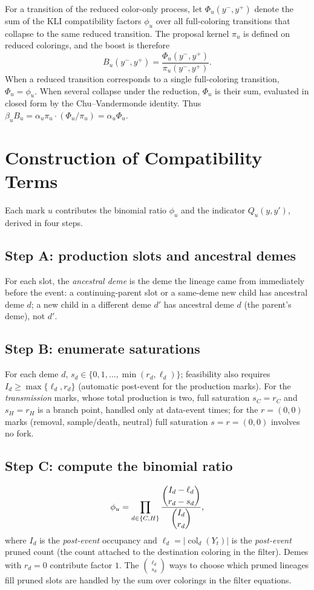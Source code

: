 \documentclass[11pt]{article}
\newcommand{\col}{\operatorname{col}}
\theoremstyle{plain}
\begin{document}
For a transition of the reduced color-only process, let $\Phi_u(y^-,y^+)$ denote the sum of
the KLI compatibility factors $\phi_u$ over all full-coloring transitions that collapse to the
same reduced transition. The proposal kernel $\pi_u$ is defined on reduced colorings, and the
boost is therefore
\[
B_u(y^-,y^+)=\frac{\Phi_u(y^-,y^+)}{\pi_u(y^-,y^+)}.
\]
When a reduced transition corresponds to a single full-coloring transition, $\Phi_u=\phi_u$.
When several collapse under the reduction, $\Phi_u$ is their sum, evaluated in closed form by the Chu--Vandermonde identity. Thus
$\beta_uB_u=\alpha_u\pi_u\cdot(\Phi_u/\pi_u)=\alpha_u\Phi_u$.

\section{Construction of Compatibility Terms}
Each mark $u$ contributes the binomial ratio $\phi_u$ and the indicator $Q_u(y,y')$, derived in
four steps.

\subsection{Step A: production slots and ancestral demes}
For each slot, the \emph{ancestral deme} is the deme the lineage came from immediately before the
event: a continuing-parent slot or a same-deme new child has ancestral deme $d$; a new child in a
different deme $d'$ has ancestral deme $d$ (the parent's deme), not $d'$.

\subsection{Step B: enumerate saturations}
For each deme $d$, $s_d\in\{0,1,\dots,\min(r_d,\ell_d)\}$; feasibility also requires
$I_d\ge\max\{\ell_d,r_d\}$ (automatic post-event for the production marks). For the \emph{transmission}
marks, whose total production is two, full saturation $s_C=r_C$ and $s_H=r_H$ is a
branch point, handled only at data-event times; for the $r=(0,0)$ marks (removal, sample/death,
neutral) full saturation $s=r=(0,0)$ involves no fork.

\subsection{Step C: compute the binomial ratio}
\[
\phi_u=\prod_{d\in\{C,H\}}\frac{\dbinom{I_d-\ell_d}{r_d-s_d}}{\dbinom{I_d}{r_d}},
\]
where $I_d$ is the \emph{post-event} occupancy and $\ell_d=|\col_d(Y_t)|$ is the \emph{post-event}
pruned count (the count attached to the destination coloring in the filter). Demes with $r_d=0$
contribute factor $1$. The $\binom{\ell_d}{s_d}$ ways to choose which pruned lineages fill pruned
slots are handled by the sum over colorings in the filter equations.
\end{document}
